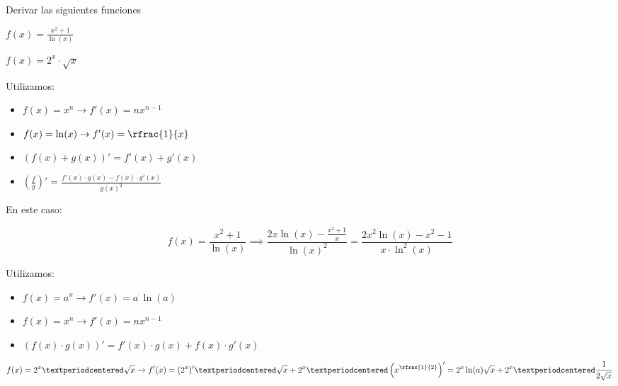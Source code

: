 \documentclass[palatino,nosec,nochap,nobuilddate]{Docencia}
\begin{document}
\begin{problem}

Derivar las siguientes funciones

\ppart $\displaystyle f(x) = \frac{x^2+1}{\ln(x)}$

\ppart $\displaystyle f(x) = 2^x·\sqrt{x}$

\solution

\spart 
Utilizamos: 

\begin{itemize}
	\item $f(x) = x^n \to f'(x) = nx^{n-1}$
	\item $f(x) = \ln(x) \to f'(x) = \rfrac{1}{x}$
	\item $(f(x)+g(x))' = f'(x) + g'(x)$
	\item $\displaystyle \left(\frac{f}{g}\right)' = \frac{f'(x)·g(x) - f(x)·g'(x)}{g(x)^2}$
\end{itemize}

En este caso:

\[
	f(x) = \frac{x^2+1}{\ln(x)} \implies \frac{2x\ln(x) - \frac{x^2+1}{x}}{\ln(x)^2} = \frac{2x^2\ln(x)-x^2-1}{x·\ln^2(x)}
\]

\spart Utilizamos: 
\begin{itemize}
	\item $f(x) = a^x \to f'(x) = a^·\ln(a)$
	\item $f(x) = x^n \to f'(x) = nx^{n-1}$
	\item $\displaystyle \left(f(x)·g(x)\right)' = f'(x)·g(x) + f(x)·g'(x)$
\end{itemize}

\[
f(x) = 2^x·\sqrt{x} \to f'(x) = (2^x)'·\sqrt{x} + 2^x·\left(x^{\rfrac{1}{2}}\right)' = 2^x\ln(a)\sqrt{x} + 2^x·\frac{1}{2\sqrt{x}}
\]

\end{problem}
\end{document}
